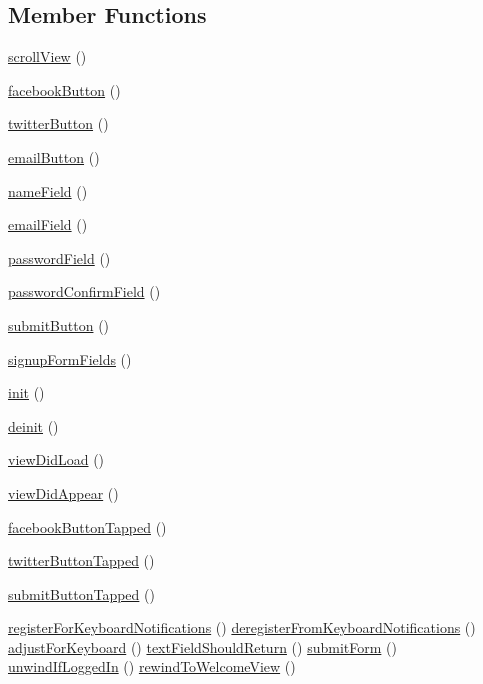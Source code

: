 \subsection*{Member Functions}
\begin{DoxyCompactItemize}
\item 
\hyperlink{class_SignupViewController.iOS.scrollView}{scrollView} ()
\item 
\hyperlink{class_SignupViewController.iOS.facebookButton}{facebookButton} ()
\item 
\hyperlink{class_SignupViewController.iOS.twitterButton}{twitterButton} ()
\item 
\hyperlink{class_SignupViewController.iOS.emailButton}{emailButton} ()
\item 
\hyperlink{class_SignupViewController.iOS.nameField}{nameField} ()
\item 
\hyperlink{class_SignupViewController.iOS.emailField}{emailField} ()
\item 
\hyperlink{class_SignupViewController.iOS.passwordField}{passwordField} ()
\item 
\hyperlink{class_SignupViewController.iOS.passwordConfirmField}{passwordConfirmField} ()
\item 
\hyperlink{class_SignupViewController.iOS.submitButton}{submitButton} ()
\item 
\hyperlink{class_SignupViewController.iOS.signupFormFields}{signupFormFields} ()
\item 
\hyperlink{class_SignupViewController.iOS.init}{init} ()
\item 
\hyperlink{class_SignupViewController.iOS.deinit}{deinit} ()
\item 
\hyperlink{class_SignupViewController.iOS.viewDidLoad}{viewDidLoad} ()
\item 
\hyperlink{class_SignupViewController.iOS.viewDidAppear}{viewDidAppear} ()
\item 
\hyperlink{class_SignupViewController.iOS.facebookButtonTapped}{facebookButtonTapped} ()
\item 
\hyperlink{class_SignupViewController.iOS.twitterButtonTapped}{twitterButtonTapped} ()
\item 
\hyperlink{class_SignupViewController.iOS.submitButtonTapped}{submitButtonTapped} ()
\item 
\hyperlink{class_SignupViewController.iOS.registerForKeyboardNotifications}{registerForKeyboardNotifications} ()
\hyperlink{class_SignupViewController.iOS.deregisterFromKeyboardNotifications}{deregisterFromKeyboardNotifications} ()
\hyperlink{class_SignupViewController.iOS.adjustForKeyboard}{adjustForKeyboard} ()
\hyperlink{class_SignupViewController.iOS.textFieldShouldReturn}{textFieldShouldReturn} ()
\hyperlink{class_SignupViewController.iOS.submitForm}{submitForm} ()
\hyperlink{class_SignupViewController.iOS.unwindIfLoggedIn}{unwindIfLoggedIn} ()
\hyperlink{class_SignupViewController.iOS.rewindToWelcomeView}{rewindToWelcomeView} ()

\end{DoxyCompactItemize}




